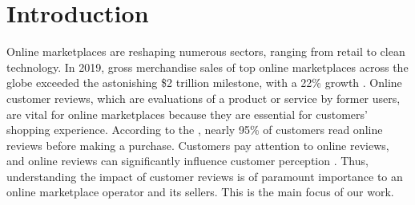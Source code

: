 \documentclass[msom,blindrev]{informs3}
\begin{document}
%


\section{Introduction}


Online marketplaces are reshaping numerous sectors, ranging from retail to clean technology. In 2019, gross merchandise sales of top online marketplaces across the globe exceeded the astonishing \$2 trillion milestone, with a 22\% growth \citep{onlinemarket}. Online customer reviews, which are evaluations of a product or service by former users, are vital for online marketplaces because they are essential for customers' shopping experience. According to the \cite{Northwestern}, nearly 95\% of customers read online reviews before making a purchase.
Customers pay attention to online reviews, and online reviews can significantly influence customer perception \citep{askalidis2016value,reviewmatter}. Thus, understanding the impact of customer reviews is of paramount importance to an online marketplace operator and its sellers. This is the main focus of our work.
\end{document}
